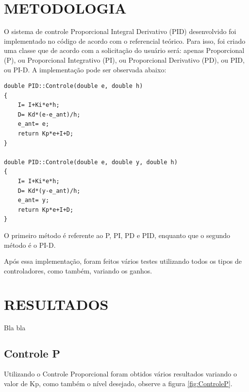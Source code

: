 \documentclass[a4paper,12pt]{article}
\begin{document}
\newpage


\thispagestyle{main}

\section{METODOLOGIA}

\hspace{4ex}O sistema de controle Proporcional Integral Derivativo (PID) desenvolvido foi implementado no código de acordo com o referencial teórico. Para isso, foi criado uma classe que de acordo com a solicitação do usuário será: apenas Proporcional (P), ou Proporcional Integrativo (PI), ou Proporcional Derivativo (PD), ou PID, ou PI-D. A implementação pode ser observada abaixo:

\begin{lstlisting}
double PID::Controle(double e, double h)
{
    I= I+Ki*e*h;
    D= Kd*(e-e_ant)/h;
    e_ant= e;
    return Kp*e+I+D;
}

double PID::Controle(double e, double y, double h)
{
    I= I+Ki*e*h;
    D= Kd*(y-e_ant)/h;
    e_ant= y;
    return Kp*e+I+D;
}
\end{lstlisting}

\hspace{4ex}O primeiro método é referente ao P, PI, PD e PID, enquanto que o segundo método é o PI-D.

\hspace{4ex}Após essa implementação, foram feitos vários testes utilizando todos os tipos de controladores, como também, variando os ganhos.

\newpage


\thispagestyle{main}

\section{RESULTADOS}

\hspace{4ex}Bla bla

\subsection{Controle P}
\hspace{4ex}Utilizando o Controle Proporcional foram obtidos vários resultados variando o valor de Kp, como também o nível desejado, observe a figura \ref{fig:ControleP}.
\end{document}
